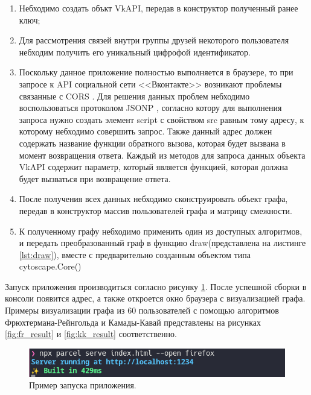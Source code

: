\documentclass[14pt, russian]{scrartcl}
\begin{document}
\begin{enumerate}
	\item Небходимо создать объкт VkAPI, передав в конструктор полученный ранее ключ;
	\item Для рассмотрения связей внутри группы друзей некоторого пользователя небходим получить его уникальный цифрофой идентификатор.
	\item Поскольку данное приложение полностью выполняется в браузере, то при запросе к API социальной сети <<Вконтакте>> возникают проблемы связанные с CORS \cite{CORS}. Для решения данных проблем небходимо воспользоваться протоколом JSONP \cite{JSONP}, согласно котору для выполнения запроса нужно создать элемент script с свойством src равным тому адресу, к которому небходимо совершить запрос. Также данный адрес должен содержать название функции обратного вызова, которая будет вызвана в момент возвращения ответа. Каждый из методов для запроса данных объекта VkAPI содержит параметр, который является функцией, которая должна будет вызваться при возвращение ответа.
	\item После получения всех данных небходимо сконструировать объект графа, передав в конструктор массив пользователей графа и матрицу смежности.
	\item К полученному графу небходимо применить один из доступных алгоритмов, и передать преобразованный граф в функцию draw(представлена на листинге \ref{lst:draw}), вместе с предварительно созданным объектом типа cytoscape.Core()
\end{enumerate}

Запуск приложения производиться согласно рисунку \ref{fig:run_app}. После успешной сборки в консоли появится адрес, а также откроется окно браузера с визуализацией графа. Примеры визуализации графа из 60 пользователей с помощью алгоритмов Фрюхтермана-Рейнгольда и Камады-Кавай представлены на рисунках \ref{fig:fr_result} и  \ref{fig:kk_result} соответственно.

\begin{figure}[H]
	\centering
	\begin{minipage}[t]{.8\textwidth}
		\centering
		\includegraphics[width=.8\textwidth]{./imgs/run_app.png}
	\end{minipage}
	\caption{Пример запуска приложения.}
	\label{fig:run_app}
\end{figure}
\end{document}
